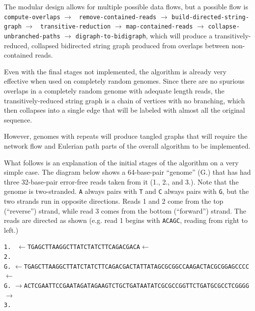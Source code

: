 \documentclass[letterpaper,12pt]{article}
\begin{document}
The modular design allows for multiple possible data flows, but a possible flow
is
{\tt compute-overlaps} $\to$ {\tt
remove-contained-reads} $\to$ {\tt build-directed-string-graph} $\to$ {\tt
transitive-reduction} $\to$
{\tt map-contained-reads} $\to$
{\tt collapse-unbranched-paths} $\to$ {\tt digraph-to-bidigraph}, which will produce a
transitively-reduced, collapsed bidirected string graph produced from overlaps
between non-contained reads.

Even with the final stages not implemented, the algorithm is already very
effective when used on completely random genomes.  Since there are no spurious
overlaps in a completely random genome with adequate length reads, the
transitively-reduced string graph is a chain of vertices with no branching,
which then collapses into a single edge that will be labeled with almost all the
original sequence.

However, genomes with repeats will produce tangled graphs that will require the
network flow and Eulerian path parts of the overall algorithm to be implemented.

What follows is an explanation of the initial stages of the algorithm on a very
simple case.  The diagram below shows a 64-base-pair ``genome'' (G.) that has
had three 32-base-pair error-free reads taken from it (1., 2., and 3.).  Note
that the genome is two-stranded.  {\tt A} always pairs with {\tt T} and {\tt C}
always pairs with {\tt G}, but the two strands run in opposite directions.
Reads 1 and 2 come from the top (``reverse'') strand, while read 3 comes from
the bottom (``forward'') strand.  The reads are directed as shown (e.g.  read 1
begins with {\tt ACAGC}, reading from right to left.)

\vspace{0.5cm}
\nopagebreak

\noindent
{\tt 1.}
{\tt \color{red} $\leftarrow$TGAGCTTAAGGCTTATCTATCTTCAGACGACA$\leftarrow$ }\\
{\tt 2.}
\\
{\tt G.}
{\tt $\leftarrow$TGAGCTTAAGGCTTATCTATCTTCAGACGACTATTATAGCGCGGCCAAGACTACGCGGAGCCCC$\leftarrow$} \\
{\tt G.}
{\tt $\rightarrow$ACTCGAATTCCGAATAGATAGAAGTCTGCTGATAATATCGCGCCGGTTCTGATGCGCCTCGGGG$\rightarrow$} \\
{\tt 3.}
\vspace{0.5cm}
\end{document}
